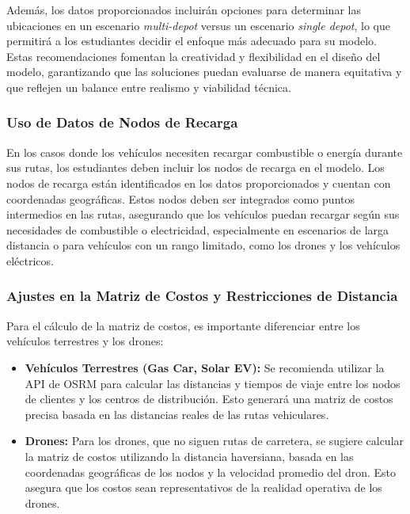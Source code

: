 \documentclass[12pt]{article}
\begin{document}
Además, los datos proporcionados incluirán opciones para determinar las ubicaciones en un escenario \textit{multi-depot} versus un escenario \textit{single depot}, lo que permitirá a los estudiantes decidir el enfoque más adecuado para su modelo. Estas recomendaciones fomentan la creatividad y flexibilidad en el diseño del modelo, garantizando que las soluciones puedan evaluarse de manera equitativa y que reflejen un balance entre realismo y viabilidad técnica.

\subsubsection{Uso de Datos de Nodos de Recarga}

En los casos donde los vehículos necesiten recargar combustible o energía durante sus rutas, los estudiantes deben incluir los nodos de recarga en el modelo. Los nodos de recarga están identificados en los datos proporcionados y cuentan con coordenadas geográficas. Estos nodos deben ser integrados como puntos intermedios en las rutas, asegurando que los vehículos puedan recargar según sus necesidades de combustible o electricidad, especialmente en escenarios de larga distancia o para vehículos con un rango limitado, como los drones y los vehículos eléctricos.

\subsubsection{Ajustes en la Matriz de Costos y Restricciones de Distancia}

Para el cálculo de la matriz de costos, es importante diferenciar entre los vehículos terrestres y los drones:
\begin{itemize}
    \item \textbf{Vehículos Terrestres (Gas Car, Solar EV):} Se recomienda utilizar la API de OSRM para calcular las distancias y tiempos de viaje entre los nodos de clientes y los centros de distribución. Esto generará una matriz de costos precisa basada en las distancias reales de las rutas vehiculares.
    \item \textbf{Drones:} Para los drones, que no siguen rutas de carretera, se sugiere calcular la matriz de costos utilizando la distancia haversiana, basada en las coordenadas geográficas de los nodos y la velocidad promedio del dron. Esto asegura que los costos sean representativos de la realidad operativa de los drones.
\end{itemize}
\end{document}
